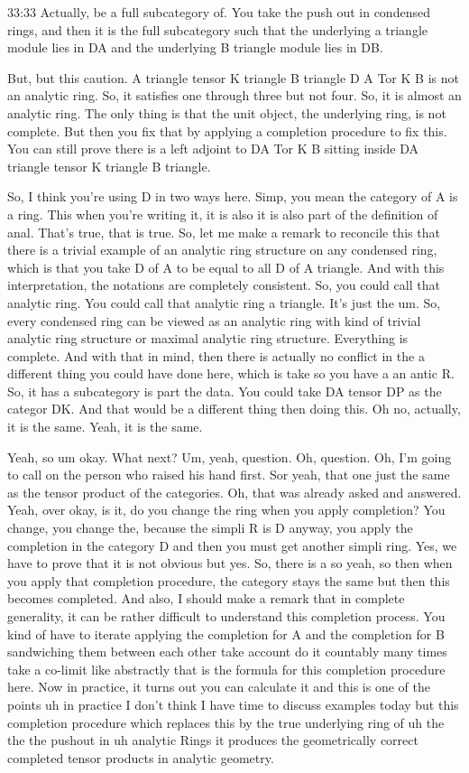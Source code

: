 \begin{unfinished}{33:33}
Actually, be a full subcategory of. You take the push out in condensed rings, and then it is the full subcategory such that the underlying a triangle module lies in DA and the underlying B triangle module lies in DB.

But, but this caution. A triangle tensor K triangle B triangle D A Tor K B is not an analytic ring. So, it satisfies one through three but not four. So, it is almost an analytic ring. The only thing is that the unit object, the underlying ring, is not complete. But then you fix that by applying a completion procedure to fix this. You can still prove there is a left adjoint to DA Tor K B sitting inside DA triangle tensor K triangle B triangle.

So, I think you're using D in two ways here. Simp, you mean the category of A is a ring. This when you're writing it, it is also it is also part of the definition of anal. That's true, that is true. So, let me make a remark to reconcile this that there is a trivial example of an analytic ring structure on any condensed ring, which is that you take D of A to be equal to all D of A triangle. And with this interpretation, the notations are completely consistent. So, you could call that analytic ring. You could call that analytic ring a triangle. It's just the um. So, every condensed ring can be viewed as an analytic ring with kind of trivial analytic ring structure or maximal analytic ring structure. Everything is complete. And with that in mind, then there is actually no conflict in the a different thing you could have done here, which is take so you have a an antic R. So, it has a subcategory is part the data. You could take DA tensor DP as the categor DK. And that would be a different thing then doing this. Oh no, actually, it is the same. Yeah, it is the same.

Yeah, so um okay. What next? Um, yeah, question. Oh, question. Oh, I'm going to call on the person who raised his hand first. Sor yeah, that one just the same as the tensor product of the categories. Oh, that was already asked and answered. Yeah, over okay, is it, do you change the ring when you apply completion? You change, you change the, because the simpli R is D anyway, you apply the completion in the category D and then you must get another simpli ring. Yes, we have to prove that it is not obvious but yes. So, there is a so yeah, so then when you apply that completion procedure, the category stays the same but then this becomes completed. And also, I should make a remark that in complete generality, it can be rather difficult to understand this completion process. You kind of have to iterate applying the completion for A and the completion for B sandwiching them between each other take account do it countably many times take a co-limit like abstractly that is the formula for this completion procedure here. Now in practice, it turns out you can calculate it and this is one of the points uh in practice I don't think I have time to discuss examples today but this completion procedure which replaces this by the true underlying ring of uh the the the pushout in uh analytic Rings it produces the geometrically correct completed tensor products in analytic geometry.


\end{unfinished}
